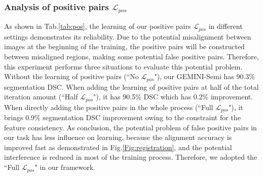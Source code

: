 \subsubsection{Analysis of positive pairs $\mathcal{L}_{pos}$}
\label{sec:positive}
\begin{table}
\centering
\caption{The learning for positive pairs $\mathcal{L}_{pos}$ in different setting on the ``T1: 3D Cardiac structures". The ``No $\mathcal{L}_{pos}$" means the training without positive pairs. The ``Half $\mathcal{L}_{pos}$" means when training to half of the total iteration amount, the learning of positive pairs is added. The ``Full $\mathcal{L}_{pos}$" means the whole training process with positive pairs.} %
\label{tab:pos}
\end{table}
As shown in Tab.\ref{tab:pos}, the learning of our positive pairs $\mathcal{L}_{pos}$ in different settings demonstrates its reliability. Due to the potential misalignment between images at the beginning of the training, the positive pairs will be constructed between misaligned regions, making some potential false positive pairs. Therefore, this experiment performs three situations to evaluate this potential problem. Without the learning of positive pairs (``No $\mathcal{L}_{pos}$"), our GEMINI-Semi has 90.3\% segmentation DSC. When adding the learning of positive pairs at half of the total iteration amount (``Half $\mathcal{L}_{pos}$"), it has 90.5\% DSC which has 0.2\% improvement. When directly adding the positive pairs in the whole process (``Full $\mathcal{L}_{pos}$"), it brings 0.9\% segmentation DSC improvement owing to the constraint for the feature consistency. As conclusion, the potential problem of false positive pairs in our task has less influence on learning, because the alignment accuracy is improved fast as demonstrated in Fig.\ref{Fig:registration}, and the potential interference is reduced in most of the training process. Therefore, we adopted the ``Full $\mathcal{L}_{pos}$" in our framework.
